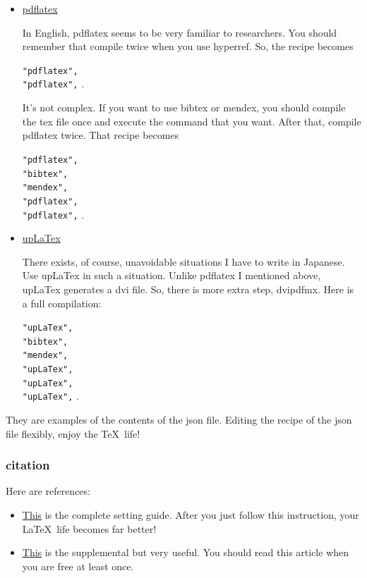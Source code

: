 \documentclass[a4paper,pdftex]{article}
\begin{document}
\begin{itemize}
  \item 
  \uline{pdflatex}

  In English, pdflatex seems to be very familiar to researchers. You should remember that compile twice when you use hyperref. So, the recipe becomes

    \texttt{"pdflatex",} \phantom{.} \\
    \texttt{"pdflatex",} .
  
  It's not complex. If you want to use bibtex or mendex, you should compile the tex file once and execute the command that you want. After that, compile pdflatex twice. That recipe becomes

    \texttt{"pdflatex",} \phantom{.} \\
    \texttt{"bibtex",} \phantom{.} \\
    \texttt{"mendex",} \phantom{.} \\
    \texttt{"pdflatex",} \phantom{.} \\
    \texttt{"pdflatex",} .
  
  \item 
  \uline{upLaTex}

  There exists, of course, unavoidable situations I have to write in Japanese. Use upLaTex in such a situation. Unlike pdflatex I mentioned above, upLaTex generates a dvi file. So, there is more extra step, dvipdfmx. Here is a full compilation:

    \texttt{"upLaTex",} \phantom{.} \\
    \texttt{"bibtex",} \phantom{.} \\
    \texttt{"mendex",} \phantom{.} \\
    \texttt{"upLaTex",} \phantom{.} \\
    \texttt{"upLaTex",} \phantom{.} \\
    \texttt{"upLaTex",} .

\end{itemize}

They are examples of the contents of the json file. Editing the recipe of the json file flexibly, enjoy the \TeX\ life!

\subsubsection{citation}

Here are references:
\begin{itemize}
  \item 
  \href{https://qiita.com/passive-radio/items/623c9a35e86b6666b89e}{This} is the complete setting guide. After you just follow this instruction, your \LaTeX\ life becomes far better!

  \item 
  \href{https://qiita.com/K-eno/items/53b81b4501f1f8318fa4}{This} is the supplemental but very useful. You should read this article when you are free at least once.
  
\end{itemize}
\end{document}
